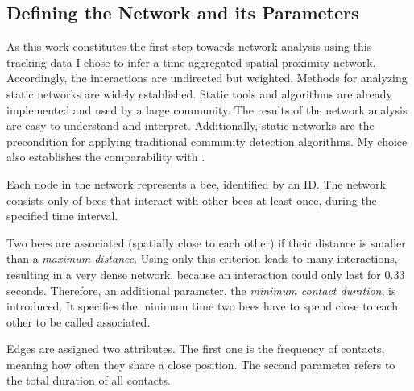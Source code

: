 \subsection{Defining the Network and its Parameters}
As this work constitutes the first step towards network analysis using this tracking data I chose to infer a time-aggregated spatial proximity network.
Accordingly, the interactions are undirected but weighted.
Methods for analyzing static networks are widely established.
Static tools and algorithms are already implemented and used by a large community.
The results of the network analysis are easy to understand and interpret.
Additionally, static networks are the precondition for applying traditional community detection algorithms. My choice also establishes the comparability with \textcite{mersch2013tracking}.

Each node in the network represents a bee, identified by an ID.
The network consists only of bees that interact with other bees at least once, during the specified time interval.

Two bees are associated (spatially close to each other) if their distance is smaller than a \emph{maximum distance}.
Using only this criterion leads to many interactions, resulting in a very dense network, because an interaction could only last for 0.33 seconds.
Therefore, an additional parameter, the \emph{minimum contact duration}, is introduced.
It specifies the minimum time two bees have to spend close to each other to be called associated.

Edges are assigned two attributes.
The first one is the frequency of contacts, meaning how often they share a close position. The second parameter refers to the total duration of all contacts.


